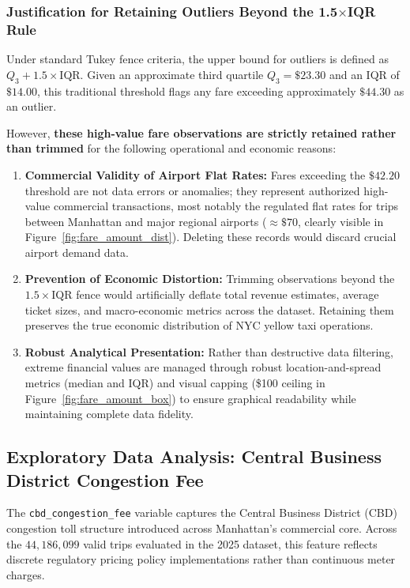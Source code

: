 \documentclass[11pt,a4paper]{article}
\begin{document}
\subsubsection{Justification for Retaining Outliers Beyond the 1.5$\times$IQR Rule}
Under standard Tukey fence criteria, the upper bound for outliers is defined as $Q_3 + 1.5 \times \text{IQR}$. Given an approximate third quartile $Q_3 = \$23.30$ and an IQR of $\$14.00$, this traditional threshold flags any fare exceeding approximately $\$44.30$ as an outlier.

However, \textbf{these high-value fare observations are strictly retained rather than trimmed} for the following operational and economic reasons:
\begin{enumerate}
    \item \textbf{Commercial Validity of Airport Flat Rates:} Fares exceeding the $\$42.20$ threshold are not data errors or anomalies; they represent authorized high-value commercial transactions, most notably the regulated flat rates for trips between Manhattan and major regional airports ($\approx \$70$, clearly visible in Figure~\ref{fig:fare_amount_dist}). Deleting these records would discard crucial airport demand data.
    \item \textbf{Prevention of Economic Distortion:} Trimming observations beyond the $1.5 \times \text{IQR}$ fence would artificially deflate total revenue estimates, average ticket sizes, and macro-economic metrics across the dataset. Retaining them preserves the true economic distribution of NYC yellow taxi operations.
    \item \textbf{Robust Analytical Presentation:} Rather than destructive data filtering, extreme financial values are managed through robust location-and-spread metrics (median and IQR) and visual capping (\$100 ceiling in Figure~\ref{fig:fare_amount_box}) to ensure graphical readability while maintaining complete data fidelity.
\end{enumerate}

\subsection{Exploratory Data Analysis: Central Business District Congestion Fee}
\label{sec:eda_cbd_congestion_fee}

The \texttt{cbd\_congestion\_fee} variable captures the Central Business District (CBD) congestion toll structure introduced across Manhattan's commercial core. Across the $44,186,099$ valid trips evaluated in the 2025 dataset, this feature reflects discrete regulatory pricing policy implementations rather than continuous meter charges.
\end{document}
